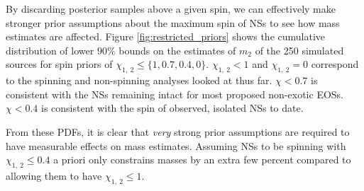 By discarding posterior samples above a given spin, we can effectively make stronger prior assumptions about the maximum spin of NSs to see how mass estimates are affected.  Figure \ref{fig:restricted_priors} shows the cumulative distribution of lower $90\%$ bounds on the estimates of $m_2$ of the 250 simulated sources for spin priors of $\chi_{1,~2} \leq \{1, 0.7, 0.4, 0\}$.  $\chi_{1,~2}<1$ and $\chi_{1,~2}=0$ correspond to the spinning and non-spinning analyses looked at thus far.  $\chi<0.7$ is consistent with the NSs remaining intact for most proposed non-exotic EOSs.  $\chi<0.4$ is consistent with the spin of observed, isolated NSs to date.

From these PDFs, it is clear that \emph{very} strong prior assumptions are required to have measurable effects on mass estimates. Assuming NSs to be spinning with $\chi_{1,~2}\leq 0.4$ a priori only constrains masses by an extra few percent compared to allowing them to have $\chi_{1,~2} \leq 1$.
  